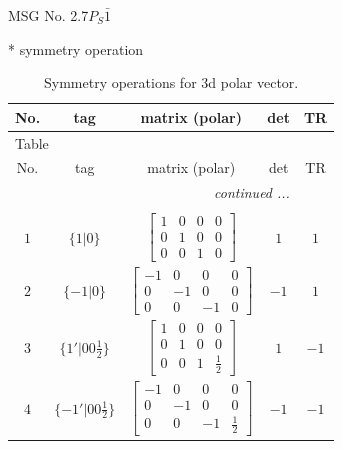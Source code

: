 \documentclass[fleqn,8pt]{jsarticle}
\begin{document}
\setcounter{MaxMatrixCols}{32}

\renewcommand{\tablename}{Table~}
\renewcommand{\figurename}{Figure~}
\begin{center}
\LARGE
MSG No. 2.7\quad$P_{S}\bar{1}$
\end{center}
* symmetry operation
\renewcommand{\arraystretch}{1.3}
\begin{longtable}{ccccc}
\caption{Symmetry operations for 3d polar vector.}
 \\
 \hline \hline
No. & tag & matrix (polar) & det & TR \\ \hline \endfirsthead

\multicolumn{4}{l}{\tablename\ \thetable{}} \\
 \hline \hline
No. & tag & matrix (polar) & det & TR \\ \hline \endhead

 \hline \hline
\multicolumn{4}{r}{\footnotesize\it continued ...} \\ \endfoot

 \hline \hline
\multicolumn{4}{r}{} \\ \endlastfoot

$ 1 $ & $ \{1|0\} $ & $ \begin{bmatrix} 1 & 0 & 0 & 0 \\ 0 & 1 & 0 & 0 \\ 0 & 0 & 1 & 0 \end{bmatrix} $ & $ 1 $ & $ 1 $ \\ \hline
$ 2 $ & $ \{-1|0\} $ & $ \begin{bmatrix} -1 & 0 & 0 & 0 \\ 0 & -1 & 0 & 0 \\ 0 & 0 & -1 & 0 \end{bmatrix} $ & $ -1 $ & $ 1 $ \\ \hline
$ 3 $ & $ \{1{}'|0 0 \frac{1}{2}\} $ & $ \begin{bmatrix} 1 & 0 & 0 & 0 \\ 0 & 1 & 0 & 0 \\ 0 & 0 & 1 & \frac{1}{2} \end{bmatrix} $ & $ 1 $ & $ -1 $ \\ \hline
$ 4 $ & $ \{-1{}'|0 0 \frac{1}{2}\} $ & $ \begin{bmatrix} -1 & 0 & 0 & 0 \\ 0 & -1 & 0 & 0 \\ 0 & 0 & -1 & \frac{1}{2} \end{bmatrix} $ & $ -1 $ & $ -1 $ \\
\end{longtable}
\end{document}
